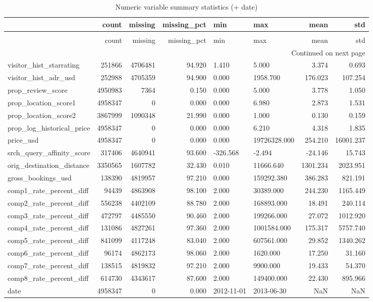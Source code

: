 \begin{longtable}{lrrrllrr}
\caption{Numeric variable summary statistics (+ date)} \label{tab:numeric_summary_stats} \\
\toprule
 & count & missing & missing\_pct & min & max & mean & std \\
\midrule
\endfirsthead
\caption[]{Numeric variable summary statistics (+ date)} \\
\toprule
 & count & missing & missing\_pct & min & max & mean & std \\
\midrule
\endhead
\midrule
\multicolumn{8}{r}{Continued on next page} \\
\midrule
\endfoot
\bottomrule
\endlastfoot
visitor\_hist\_starrating & 251866 & 4706481 & 94.920 & 1.410 & 5.000 & 3.374 & 0.693 \\
visitor\_hist\_adr\_usd & 252988 & 4705359 & 94.900 & 0.000 & 1958.700 & 176.023 & 107.254 \\
prop\_review\_score & 4950983 & 7364 & 0.150 & 0.000 & 5.000 & 3.778 & 1.050 \\
prop\_location\_score1 & 4958347 & 0 & 0.000 & 0.000 & 6.980 & 2.873 & 1.531 \\
prop\_location\_score2 & 3867999 & 1090348 & 21.990 & 0.000 & 1.000 & 0.130 & 0.159 \\
prop\_log\_historical\_price & 4958347 & 0 & 0.000 & 0.000 & 6.210 & 4.318 & 1.835 \\
price\_usd & 4958347 & 0 & 0.000 & 0.000 & 19726328.000 & 254.210 & 16001.237 \\
srch\_query\_affinity\_score & 317406 & 4640941 & 93.600 & -326.568 & -2.494 & -24.146 & 15.743 \\
orig\_destination\_distance & 3350565 & 1607782 & 32.430 & 0.010 & 11666.640 & 1301.234 & 2023.951 \\
gross\_bookings\_usd & 138390 & 4819957 & 97.210 & 0.000 & 159292.380 & 386.283 & 821.191 \\
comp1\_rate\_percent\_diff & 94439 & 4863908 & 98.100 & 2.000 & 30389.000 & 244.230 & 1165.449 \\
comp2\_rate\_percent\_diff & 556238 & 4402109 & 88.780 & 2.000 & 168893.000 & 18.491 & 240.114 \\
comp3\_rate\_percent\_diff & 472797 & 4485550 & 90.460 & 2.000 & 199266.000 & 27.072 & 1012.920 \\
comp4\_rate\_percent\_diff & 131086 & 4827261 & 97.360 & 2.000 & 1001584.000 & 175.317 & 5757.740 \\
comp5\_rate\_percent\_diff & 841099 & 4117248 & 83.040 & 2.000 & 607561.000 & 29.852 & 1340.262 \\
comp6\_rate\_percent\_diff & 96174 & 4862173 & 98.060 & 2.000 & 1620.000 & 17.250 & 31.160 \\
comp7\_rate\_percent\_diff & 138515 & 4819832 & 97.210 & 2.000 & 9900.000 & 19.433 & 54.370 \\
comp8\_rate\_percent\_diff & 614730 & 4343617 & 87.600 & 2.000 & 149400.000 & 22.430 & 895.966 \\
date & 4958347 & 0 & 0.000 & 2012-11-01 & 2013-06-30 & NaN & NaN \\
\end{longtable}
